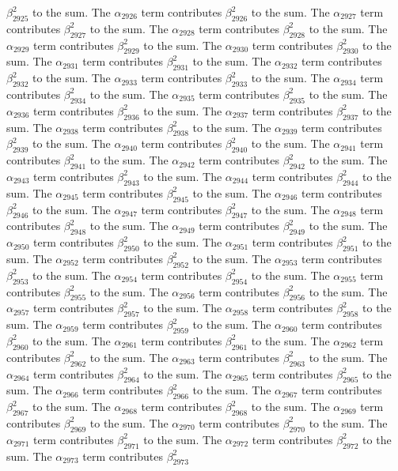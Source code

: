 \begin{lemma}
$\beta_{2925}^{2}$ to the sum. The $\alpha_{2926}$ term contributes $\beta_{2926}^{2}$ to the sum. The $\alpha_{2927}$ term contributes $\beta_{2927}^{2}$ to the sum. The $\alpha_{2928}$ term contributes $\beta_{2928}^{2}$ to the sum. The $\alpha_{2929}$ term contributes $\beta_{2929}^{2}$ to the sum. The $\alpha_{2930}$ term contributes $\beta_{2930}^{2}$ to the sum. The $\alpha_{2931}$ term contributes $\beta_{2931}^{2}$ to the sum. The $\alpha_{2932}$ term contributes $\beta_{2932}^{2}$ to the sum. The $\alpha_{2933}$ term contributes $\beta_{2933}^{2}$ to the sum. The $\alpha_{2934}$ term contributes $\beta_{2934}^{2}$ to the sum. The $\alpha_{2935}$ term contributes $\beta_{2935}^{2}$ to the sum. The $\alpha_{2936}$ term contributes $\beta_{2936}^{2}$ to the sum. The $\alpha_{2937}$ term contributes $\beta_{2937}^{2}$ to the sum. The $\alpha_{2938}$ term contributes $\beta_{2938}^{2}$ to the sum. The $\alpha_{2939}$ term contributes $\beta_{2939}^{2}$ to the sum. The $\alpha_{2940}$ term contributes $\beta_{2940}^{2}$ to the sum. The $\alpha_{2941}$ term contributes $\beta_{2941}^{2}$ to the sum. The $\alpha_{2942}$ term contributes $\beta_{2942}^{2}$ to the sum. The $\alpha_{2943}$ term contributes $\beta_{2943}^{2}$ to the sum. The $\alpha_{2944}$ term contributes $\beta_{2944}^{2}$ to the sum. The $\alpha_{2945}$ term contributes $\beta_{2945}^{2}$ to the sum. The $\alpha_{2946}$ term contributes $\beta_{2946}^{2}$ to the sum. The $\alpha_{2947}$ term contributes $\beta_{2947}^{2}$ to the sum. The $\alpha_{2948}$ term contributes $\beta_{2948}^{2}$ to the sum. The $\alpha_{2949}$ term contributes $\beta_{2949}^{2}$ to the sum. The $\alpha_{2950}$ term contributes $\beta_{2950}^{2}$ to the sum. The $\alpha_{2951}$ term contributes $\beta_{2951}^{2}$ to the sum. The $\alpha_{2952}$ term contributes $\beta_{2952}^{2}$ to the sum. The $\alpha_{2953}$ term contributes $\beta_{2953}^{2}$ to the sum. The $\alpha_{2954}$ term contributes $\beta_{2954}^{2}$ to the sum. The $\alpha_{2955}$ term contributes $\beta_{2955}^{2}$ to the sum. The $\alpha_{2956}$ term contributes $\beta_{2956}^{2}$ to the sum. The $\alpha_{2957}$ term contributes $\beta_{2957}^{2}$ to the sum. The $\alpha_{2958}$ term contributes $\beta_{2958}^{2}$ to the sum. The $\alpha_{2959}$ term contributes $\beta_{2959}^{2}$ to the sum. The $\alpha_{2960}$ term contributes $\beta_{2960}^{2}$ to the sum. The $\alpha_{2961}$ term contributes $\beta_{2961}^{2}$ to the sum. The $\alpha_{2962}$ term contributes $\beta_{2962}^{2}$ to the sum. The $\alpha_{2963}$ term contributes $\beta_{2963}^{2}$ to the sum. The $\alpha_{2964}$ term contributes $\beta_{2964}^{2}$ to the sum. The $\alpha_{2965}$ term contributes $\beta_{2965}^{2}$ to the sum. The $\alpha_{2966}$ term contributes $\beta_{2966}^{2}$ to the sum. The $\alpha_{2967}$ term contributes $\beta_{2967}^{2}$ to the sum. The $\alpha_{2968}$ term contributes $\beta_{2968}^{2}$ to the sum. The $\alpha_{2969}$ term contributes $\beta_{2969}^{2}$ to the sum. The $\alpha_{2970}$ term contributes $\beta_{2970}^{2}$ to the sum. The $\alpha_{2971}$ term contributes $\beta_{2971}^{2}$ to the sum. The $\alpha_{2972}$ term contributes $\beta_{2972}^{2}$ to the sum. The $\alpha_{2973}$ term contributes $\beta_{2973}^{2}$ 
\end{lemma}
